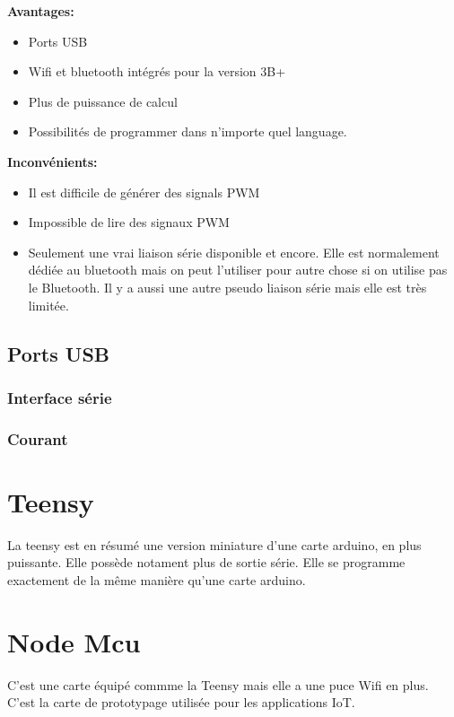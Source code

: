 \documentclass[a4paper, 11pt]{report}
\begin{document}
\textbf{Avantages:}
\begin{itemize}
\item Ports USB
\item Wifi et bluetooth intégrés pour la version 3B+
\item Plus de puissance de calcul
\item Possibilités de programmer dans n'importe quel language.
\end{itemize}

\textbf{Inconvénients:}
\begin{itemize}
\item Il est difficile de générer des signals PWM
\item Impossible de lire des signaux PWM
\item Seulement une vrai liaison série disponible et encore. Elle est normalement dédiée au bluetooth mais on peut l'utiliser pour autre chose si on utilise pas le Bluetooth. Il y a aussi une autre pseudo liaison série mais elle est très limitée.
\end{itemize}

\subsection{Ports USB}

\subsubsection{Interface série}

\subsubsection{Courant}

\section{Teensy}
La teensy est en résumé une version miniature d'une carte arduino, en plus puissante. Elle possède notament plus de sortie série. Elle se programme exactement de la même manière qu'une carte arduino.

\section{Node Mcu}
C'est une carte équipé commme la Teensy mais elle a une puce Wifi en plus. C'est la carte de prototypage utilisée pour les applications IoT.
\end{document}

